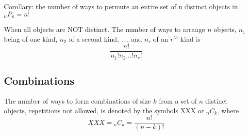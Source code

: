 Corollary: the number of ways to permute an entire set of n distinct objects in ${_n}P_n = n!$ 

When all objects are NOT distinct.  The number of ways to arrange $n$ objects, $n_1$ being of one kind, $n_2$ of a second kind, $\dots$, and $n_r$ of an $r^{th}$ kind is 
\[ \frac{n!}{n{_1}!n{_2} \dots !n{_r!}} \]

\subsection{Combinations}
The number of ways to form combinations of size $k$ from a set of $n$ distinct objects, repetitions not allowed, is denoted by the symbols XXX or ${_n}C_k$, where 
	\[ XXX = {_n}C_k = \frac{n!}{(n-k)!} \]

  

    
    
    
    
    
    
    
    
    
